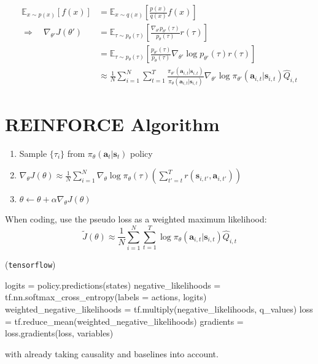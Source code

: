 \begin{align}
	\mathbb{E}_{x\sim p(x)}[f(x)] &= \mathbb{E}_{x\sim q(x)} \left[\frac{p(x)}{q(x)}f(x)\right]\\
	\Rightarrow \quad \nabla_{\theta'} J(\theta') & = \mathbb{E}_{\tau \sim p_{\theta}(\tau)} \left[ \frac{\nabla_{\theta'} p_{\theta'}(\tau)}{p_{\theta}(\tau)} r(\tau) \right]\\
	&= \mathbb{E}_{\tau \sim p_{\theta}(\tau)} \left[ \frac{p_{\theta'}(\tau)}{p_{\theta}(\tau)} \nabla_{\theta'}\log p_{\theta'}(\tau) r(\tau) \right]\\
	&\approx \frac{1}{N} \sum_{i=1}^N \sum_{t=1}^T \frac{\pi_{\theta'}(\textbf{a}_{i,t} | \textbf{s}_{i,t})}{\pi_{\theta}(\textbf{a}_{i,t} | \textbf{s}_{i,t})} \nabla_{\theta'} \log \pi_{\theta'} (\textbf{a}_{i,t} | \textbf{s}_{i,t}) \widehat{Q}_{i,t}
\end{align}

\section{REINFORCE Algorithm}
\begin{enumerate}
	\item {}Sample $\{\tau_i\}$ from $\pi_\theta(\textbf{a}_t|\textbf{s}_t)$ policy
	\item $\nabla_\theta J(\theta) \approx \frac{1}{N} \sum_{i=1}^{N} \nabla_\theta\log \pi_\theta(\tau) \left(\sum_{t'=t}^{T} r(\textbf{s}_{i,t'}, \textbf{a}_{i, t'})\right)$
	\item {}$\theta \leftarrow \theta + \alpha \nabla_\theta J(\theta)$
	 \qquad \cite{williams1992jml}
\end{enumerate}

When coding, use the pseudo loss as a weighted maximum likelihood:
\begin{equation}
	\widetilde{J}(\theta) \approx \frac{1}{N} \sum_{i=1}^{N} \sum_{t=1}^{T} \log \pi_{\theta} (\textbf{a}_{i,t} | \textbf{s}_{i,t} ) \widehat{Q}_{i,t}
\end{equation}

 (\texttt{tensorflow})
\begin{python}
logits = policy.predictions(states)
negative_likelihoods = tf.nn.softmax_cross_entropy(labels = actions, logits)
weighted_negative_likelihoods = tf.multiply(negative_likelihoods, q_values)
loss = tf.reduce_mean(weighted_negative_likelihoods)
gradients = loss.gradients(loss, variables)
\end{python}
with  already taking causality and baselines into account.

